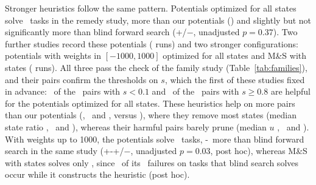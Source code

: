 \documentclass[letterpaper]{article}
\newcommand{\num}[1]{\numprint{#1}}
\theoremstyle{plain}
\theoremstyle{definition}
\theoremstyle{remark}
\begin{document}
Stronger heuristics follow the same pattern.
Potentials optimized for all states solve \RemSolvedPotAllPlain\ tasks in the remedy study, more than our potentials (\RemSolvedPotPlain) and slightly but not significantly more than blind forward search (+\RemPotAllVsFwGains/$-$\RemPotAllVsFwLosses, unadjusted $p=0.37$).
Two further studies record these potentials (\num{\PotAllCells} runs) and two stronger configurations: potentials with weights in $[-1000,1000]$ optimized for all states and M\&S with \num{200000} states (\num{3156} runs).
All three pass the check of the family study (Table~\ref{tab:families}), and their pairs confirm the thresholds on $s$, which the first of these studies fixed in advance: \PotAllLowHelpful\ of the \PotAllLowPairs\ pairs with $s<0.1$ and \PotAllHighHelpful\ of the \PotAllHighPairs\ pairs with $s\geq0.8$ are helpful for the potentials optimized for all states.
These heuristics help on more pairs than our potentials (\PotAllHelpful, \StPotHelpful\ and \StMsHelpful, versus \GenPotHelpful), where they remove most states (median state ratio \PotAllHelpStates, \StPotHelpStates\ and \StMsHelpStates), whereas their harmful pairs barely prune (median $u$ \PotAllHurtUnion, \StPotHurtUnion\ and \StMsHurtUnion).
With weights up to 1000, the potentials solve \StPotSolved\ tasks, \the\numexpr\StPotSolved-\StBlindSolved\relax\ more than blind forward search in the same study (+\the\numexpr\StPotSolved-\StBlindSolved+\StPotLost\relax/$-$\StPotLost, unadjusted $p=0.03$, post hoc), whereas M\&S with \num{200000} states solves only \StMsSolved, since \StMsUnconstructed\ of its \StMsLost\ failures on tasks that blind search solves occur while it constructs the heuristic (post hoc).
\end{document}
